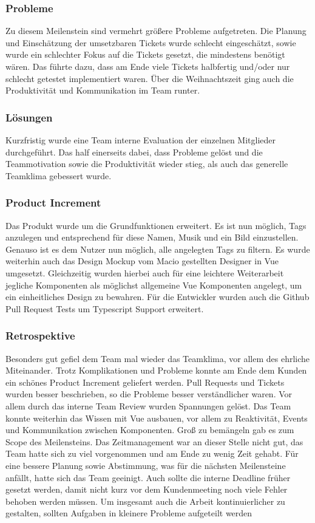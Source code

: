 \documentclass[10pt, a4paper, draft]{article}
\begin{document}
\subsubsection{Probleme}
Zu diesem Meilenstein sind vermehrt größere Probleme aufgetreten.
Die Planung und Einschätzung der umsetzbaren Tickets wurde schlecht eingeschätzt, sowie wurde ein schlechter Fokus auf die Tickets gesetzt, die mindestens benötigt wären.
Das führte dazu, dass am Ende viele Tickets halbfertig und/oder nur schlecht getestet implementiert waren.
Über die Weihnachtszeit ging auch die Produktivität und Kommunikation im Team runter.
\subsubsection{Lösungen}
Kurzfristig wurde eine Team interne Evaluation der einzelnen Mitglieder durchgeführt.
Das half einerseits dabei, dass Probleme gelöst und die Teammotivation sowie die Produktivität wieder stieg, als auch das generelle Teamklima gebessert wurde.
\subsubsection{Product Increment}
Das Produkt wurde um die Grundfunktionen erweitert.
Es ist nun möglich, Tags anzulegen und entsprechend für diese Namen, Musik und ein Bild einzustellen.
Genauso ist es dem Nutzer nun möglich, alle angelegten Tags zu filtern.
Es wurde weiterhin auch das Design Mockup vom Macio gestellten Designer in Vue umgesetzt.
Gleichzeitig wurden hierbei auch für eine leichtere Weiterarbeit jegliche Komponenten als möglichst allgemeine Vue Komponenten angelegt, um ein einheitliches Design zu bewahren.
Für die Entwickler wurden auch die Github Pull Request Tests um Typescript Support erweitert.
\subsubsection{Retrospektive}
Besonders gut gefiel dem Team mal wieder das Teamklima, vor allem des ehrliche Miteinander.
Trotz Komplikationen und Probleme konnte am Ende dem Kunden ein schönes Product Increment geliefert werden.
Pull Requests und Tickets wurden besser beschrieben, so die Probleme besser verständlicher waren.
Vor allem durch das interne Team Review wurden Spannungen gelöst.
Das Team konnte weiterhin das Wissen mit Vue ausbauen, vor allem zu Reaktivität, Events und Kommunikation zwischen Komponenten.
Groß zu bemängeln gab es zum Scope des Meilensteins.
Das Zeitmanagement war an dieser Stelle nicht gut, das Team hatte sich zu viel vorgenommen und am Ende zu wenig Zeit gehabt.
Für eine bessere Planung sowie Abstimmung, was für die nächsten Meilensteine anfällt, hatte sich das Team geeinigt.
Auch sollte die interne Deadline früher gesetzt werden, damit nicht kurz vor dem Kundenmeeting noch viele Fehler behoben werden müssen.
Um insgesamt auch die Arbeit kontinuierlicher zu gestalten, sollten Aufgaben in kleinere Probleme aufgeteilt werden
\end{document}
